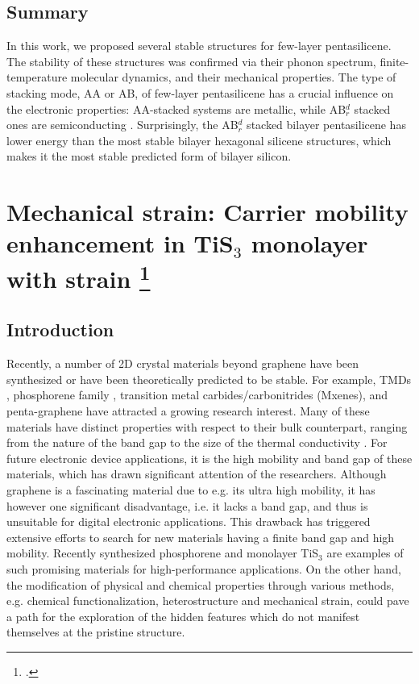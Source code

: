 \subsection{Summary}

In this work, we proposed several stable structures for few-layer pentasilicene. The stability of these structures was confirmed via their phonon spectrum, finite-temperature molecular dynamics, and their mechanical properties. The type of stacking mode, AA or AB, of few-layer pentasilicene has a crucial influence on the electronic properties: AA-stacked systems are metallic, while AB$_r^d$ stacked ones are semiconducting . Surprisingly, the AB$_r^d$ stacked bilayer pentasilicene has lower energy than the most stable bilayer hexagonal silicene structures, which makes it the most stable predicted form of bilayer silicon.  

\section[Mechanical strain: Carrier mobility enhancement in TiS$_3$ monolayer with strain]{Mechanical strain: Carrier mobility enhancement in TiS$_3$ monolayer with strain \footcite[This work is published in:][]{Aierken2016.mobility} \label{mob_Tis3}}

\subsection{Introduction}

Recently, a number of 2D crystal materials  beyond graphene \citep{Novoselov666,Novoselov26072005,Geim2007} have been synthesized or have been theoretically predicted to be stable. For example, TMDs \cite{RadisavljevicB2011,Zeng2011,Ataca2012,Liu2015, tongay-res2, PhysRevB.89.155433}, phosphorene family \cite{p1,Han2014,Adam2015,Guan2014,deniz1,deniz3}, transition metal carbides/carbonitrides (Mxenes)\cite{ADMA:ADMA201304138}, and penta-graphene \cite{Zhang2015} have attracted a growing research interest.  Many of these materials have distinct properties with respect to their bulk counterpart, ranging from the nature of the band gap\cite{Mak2010} to the size of the thermal conductivity \cite{Alexander2008}.  For future electronic device applications, it is the high mobility and band gap of these materials, which has drawn significant attention of the researchers. Although graphene is a fascinating material due to e.g. its ultra high mobility, it has however one significant disadvantage, i.e. it lacks a band gap, and thus is unsuitable for digital electronic applications. This drawback has triggered  extensive efforts to search for new materials  having a finite band gap and high mobility. Recently synthesized phosphorene and monolayer TiS$_3$\cite{ADOM:ADOM201400043,ADMA:ADMA201405632} are examples of such promising materials for high-performance applications. On the other hand, the modification of physical and chemical properties through various methods, e.g. chemical functionalization, heterostructure and mechanical strain, could pave a path for the exploration of the hidden features which do not manifest themselves at the pristine structure. 


